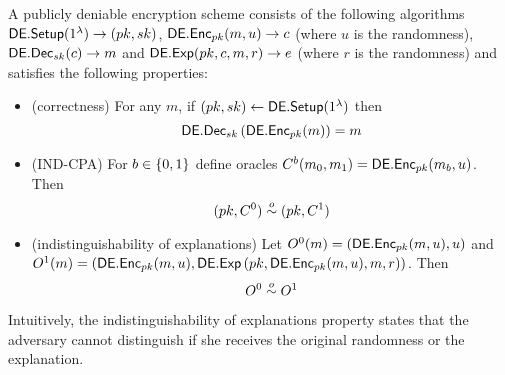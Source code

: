 \begin{mydef}
A publicly deniable encryption scheme consists of the following algorithms $\mathsf{DE.Setup}(1^\lambda)\to(pk,sk)$, $\mathsf{DE.Enc}_{pk}(m,u)\to c$ (where $u$ is the randomness), $\mathsf{DE.Dec}_{sk}(c)\to m$ and $\mathsf{DE.Exp}(pk,c,m,r)\to e$ (where $r$ is the randomness) and satisfies the following properties:
\begin{itemize}
\item (correctness) For any $m$, if $(pk,sk)\gets \mathsf{DE.Setup}(1^\lambda)$ then
\[
\mathsf{DE.Dec}_{sk}\left(\mathsf{DE.Enc}_{pk}(m)\right)=m
\]
\item (IND-CPA) For $b\in\{0,1\}$ define oracles $C^b(m_0,m_1)=\mathsf{DE.Enc}_{pk}(m_b,u)$. Then
\[
(pk,C^0)\overset{o}{\sim}(pk,C^1)
\]
\item (indistinguishability of explanations) Let $O^0(m)=\left(\mathsf{DE.Enc}_{pk}(m,u),u\right)$ and $O^1(m)=\left(\mathsf{DE.Enc}_{pk}(m,u),\mathsf{DE.Exp}\left(pk,\mathsf{DE.Enc}_{pk}(m,u),m,r\right)\right)$. Then
\[
O^0\overset{o}{\sim} O^1
\]
\end{itemize}
\end{mydef}
Intuitively, the indistinguishability of explanations property states that the adversary cannot distinguish if she receives the original randomness or the explanation.
